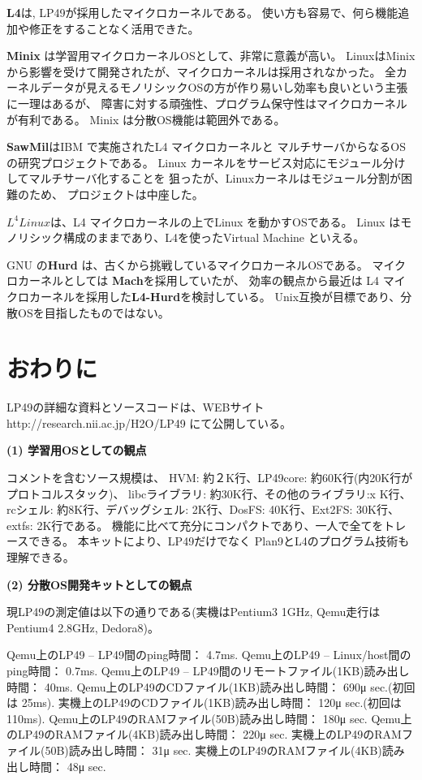 \documentclass{ipsjpapers}
\begin{document}
{\bf L4}は, LP49が採用したマイクロカーネルである。
使い方も容易で、何ら機能追加や修正をすることなく活用できた。


{\bf Minix} は学習用マイクロカーネルOSとして、非常に意義が高い。
LinuxはMinixから影響を受けて開発されたが、マイクロカーネルは採用されなかった。
全カーネルデータが見えるモノリシックOSの方が作り易いし効率も良いという主張に一理はあるが、
障害に対する頑強性、プログラム保守性はマイクロカーネルが有利である。
Minix は分散OS機能は範囲外である。


{\bf SawMil}はIBM で実施されたL4 マイクロカーネルと
マルチサーバからなるOS の研究プロジェクトである。
Linux カーネルをサービス対応にモジュール分けしてマルチサーバ化することを
狙ったが、Linuxカーネルはモジュール分割が困難のため、
プロジェクトは中座した。

{\bf $L^4Linux$}は、L4 マイクロカーネルの上でLinux を動かすOSである。
Linux はモノリシック構成のままであり、L4を使ったVirtual Machine といえる。

GNU の{\bf Hurd} は、古くから挑戦しているマイクロカーネルOSである。
マイクロカーネルとしては {\bf Mach}を採用していたが、
効率の観点から最近は L4 マイクロカーネルを採用した{\bf L4-Hurd}を検討している。
Unix互換が目標であり、分散OSを目指したものではない。



\section{おわりに}


LP49の詳細な資料とソースコードは、WEBサイト 
http://research.nii.ac.jp/H2O/LP49  にて公開している。

{\bf (1) 学習用OSとしての観点}

  コメントを含むソース規模は、  
  HVM: 約２K行、LP49core: 約60K行(内20K行がプロトコルスタック)、
  libcライブラリ: 約30K行、その他のライブラリ:x K行、
  rcシェル: 約8K行、デバッグシェル: 2K行、DosFS: 40K行、Ext2FS: 30K行、
  extfs: 2K行である。
機能に比べて充分にコンパクトであり、一人で全てをトレースできる。
本キットにより、LP49だけでなく Plan9とL4のプログラム技術も理解できる。


{\bf (2) 分散OS開発キットとしての観点}

現LP49の測定値は以下の通りである(実機はPentium3 1GHz, Qemu走行はPentium4 2.8GHz, Dedora8)。

Qemu上のLP49 -- LP49間のping時間： 4.7ms. 
Qemu上のLP49 -- Linux/host間のping時間： 0.7ms. 
Qemu上のLP49 -- LP49間のリモートファイル(1KB)読み出し時間： 40ms. 
Qemu上のLP49のCDファイル(1KB)読み出し時間： 690μ sec.(初回は 25ms). 
実機上のLP49のCDファイル(1KB)読み出し時間： 120μ sec.(初回は 110ms). 
Qemu上のLP49のRAMファイル(50B)読み出し時間： 180μ sec.
Qemu上のLP49のRAMファイル(4KB)読み出し時間： 220μ sec.
実機上のLP49のRAMファイル(50B)読み出し時間： 31μ sec.
実機上のLP49のRAMファイル(4KB)読み出し時間： 48μ sec.
\end{document}
